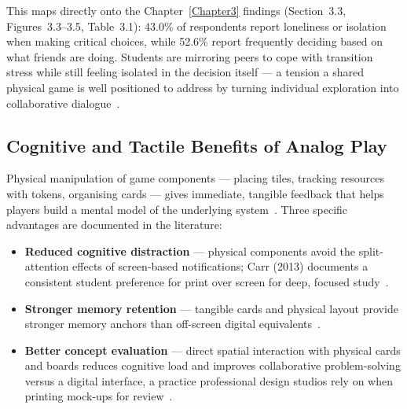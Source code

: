 This maps directly onto the Chapter~\ref{Chapter3} findings (Section~3.3, Figures~3.3--3.5, Table~3.1): 43.0\% of respondents report loneliness or isolation when making critical choices, while 52.6\% report frequently deciding based on what friends are doing. Students are mirroring peers to cope with transition stress while still feeling isolated in the decision itself --- a tension a shared physical game is well positioned to address by turning individual exploration into collaborative dialogue~\cite{Booth-2019}.

\subsection{Cognitive and Tactile Benefits of Analog Play}

Physical manipulation of game components --- placing tiles, tracking resources with tokens, organising cards --- gives immediate, tangible feedback that helps players build a mental model of the underlying system~\cite{Sousa-2021}. Three specific advantages are documented in the literature:

\begin{itemize}
    \item \textbf{Reduced cognitive distraction} --- physical components avoid the split-attention effects of screen-based notifications; Carr (2013) documents a consistent student preference for print over screen for deep, focused study~\cite{Carr-2013}.
    \item \textbf{Stronger memory retention} --- tangible cards and physical layout provide stronger memory anchors than off-screen digital equivalents~\cite{Carr-2013}.
    \item \textbf{Better concept evaluation} --- direct spatial interaction with physical cards and boards reduces cognitive load and improves collaborative problem-solving versus a digital interface, a practice professional design studios rely on when printing mock-ups for review~\cite{Pixelixe-2024}.
\end{itemize}

